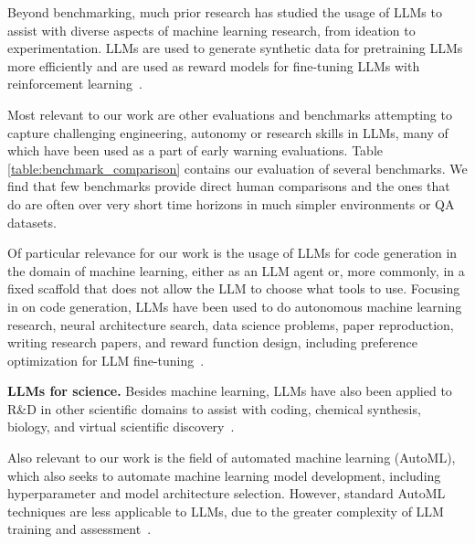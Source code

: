 \documentclass{article}
\begin{document}
Beyond benchmarking, much prior research has studied the usage of LLMs to assist with diverse aspects of machine learning research, from ideation to experimentation. LLMs are used to generate synthetic data for pretraining LLMs more efficiently and are used as reward models for fine-tuning LLMs with reinforcement learning~\cite{gunasekar2023textbooksneed, dubey2024llama3herdmodels, ouyang2022traininglanguagemodelsfollow, bai2022constitutionalaiharmlessnessai, nvidia2024nemotron4340btechnicalreport}.

Most relevant to our work are other evaluations and benchmarks attempting to capture challenging engineering, autonomy or research skills in LLMs, many of which have been used as a part of early warning evaluations. Table \ref{table:benchmark_comparison} contains our evaluation of several benchmarks. We find that few benchmarks provide direct human comparisons and the ones that do are often over very short time horizons in much simpler environments or QA datasets.

Of particular relevance for our work is the usage of LLMs for code generation in the domain of machine learning, either as an LLM agent or, more commonly, in a fixed scaffold that does not allow the LLM to choose what tools to use. Focusing in on code generation, LLMs have been used to do autonomous machine learning research, neural architecture search, data science problems, paper reproduction, writing research papers, and reward function design, including preference optimization for LLM fine-tuning~\citep{li2024mlrcopilotautonomousmachinelearning, chen2023evopromptinglanguagemodelscodelevel, guo2024dsagentautomateddatascience,bogin2024superevaluatingagentssetting,lu2024aiscientistfullyautomated,ma2024eurekahumanlevelrewarddesign, faldor2024omniepicopenendednessmodelshuman,lu2024discoveringpreferenceoptimizationalgorithms}. 

\textbf{LLMs for science.} Besides machine learning, LLMs have also been applied to R\&D in other scientific domains to assist with coding, chemical synthesis, biology, and virtual scientific discovery~\citep{tian2024scicoderesearchcodingbenchmark, ma2024sciagenttoolaugmentedlanguagemodels,bran2023chemcrowaugmentinglargelanguagemodels,zhang2024scientificlargelanguagemodels,jansen2024discoveryworldvirtualenvironmentdeveloping}.

Also relevant to our work is the field of automated machine learning (AutoML), which also seeks to automate machine learning model development, including hyperparameter and model architecture selection. However, standard AutoML techniques are less applicable to LLMs, due to the greater complexity of LLM training and assessment~\citep{tornede2024automlagelargelanguage}. 
\end{document}
